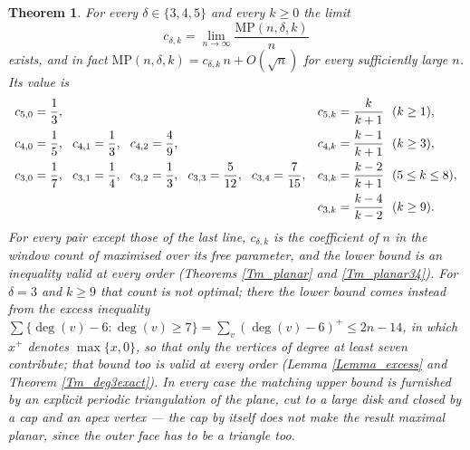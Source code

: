 \documentclass[10pt,a4paper]{article}
\newtheorem{theorem}{Theorem}
\begin{document}
\begin{theorem}
\label{Tm_intro}For every $\delta \in \{3,4,5\}$ and every $k\geq 0$ the limit
\[
c_{\delta ,k}=\lim_{n\rightarrow \infty }\frac{\mathrm{MP}(n,\delta ,k)}{n}
\]
exists, and in fact $\mathrm{MP}(n,\delta ,k)=c_{\delta ,k}\,n+O(\sqrt{n})$ for every sufficiently large
$n$. Its value is
\[
\begin{array}
[c]{ll}%
c_{5,0}=\dfrac{1}{3}, & c_{5,k}=\dfrac{k}{k+1}\ \ (k\geq 1),\\[3mm]
c_{4,0}=\dfrac{1}{5},\ \ c_{4,1}=\dfrac{1}{3},\ \ c_{4,2}=\dfrac{4}{9}, & c_{4,k}=\dfrac{k-1}{k+1}\ \
(k\geq 3),\\[3mm]
c_{3,0}=\dfrac{1}{7},\ \ c_{3,1}=\dfrac{1}{4},\ \ c_{3,2}=\dfrac{1}{3},\ \ c_{3,3}=\dfrac{5}{12},\ \
c_{3,4}=\dfrac{7}{15}, & c_{3,k}=\dfrac{k-2}{k+1}\ \ (5\leq k\leq 8),\\[3mm]
& c_{3,k}=\dfrac{k-4}{k-2}\ \ (k\geq 9).
\end{array}
\]
For every pair except those of the last line, $c_{\delta ,k}$ is the coefficient of $n$ in the window
count of \cite{P1} maximised over its free parameter, and the lower bound is an inequality valid at
every order (Theorems \ref{Tm_planar} and \ref{Tm_planar34}). For $\delta =3$ and $k\geq 9$ that count
is not optimal; there the lower bound comes instead from the excess inequality
$\sum \{\deg (v)-6:\deg (v)\geq 7\}=\sum_{v}(\deg (v)-6)^{+}\leq 2n-14$, in which $x^{+}$ denotes
$\max \{x,0\}$, so that only the vertices of degree at least seven contribute; that bound too is valid at
every order (Lemma \ref{Lemma_excess} and Theorem \ref{Tm_deg3exact}). In every case the matching upper
bound is furnished by an explicit periodic triangulation of the plane, cut to a large disk and closed by a
cap and an apex vertex --- the cap by itself does not make the result maximal planar, since the outer face
has to be a triangle too.
\end{theorem}


\end{document}
